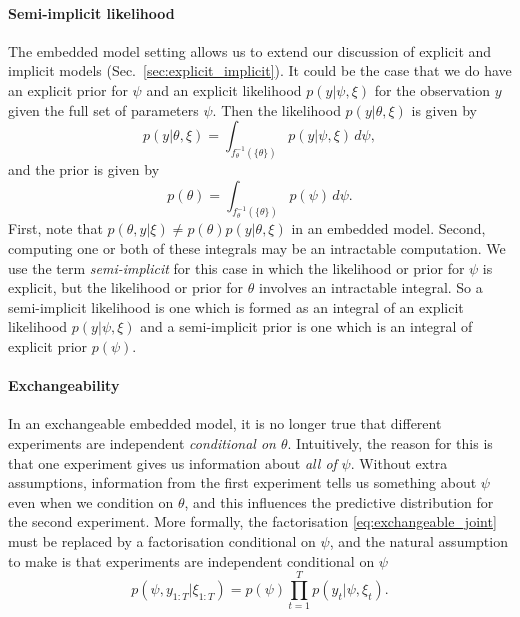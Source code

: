 \documentclass[a4paper, 10pt]{report}
\theoremstyle{plain}
\begin{document}
	\paragraph{Semi-implicit likelihood}
	The embedded model setting allows us to extend our discussion of explicit and implicit models (Sec.~\ref{sec:explicit_implicit}).
	It could be the case that we do have an explicit prior for $\psi$ and an explicit likelihood $p(y|\psi,\xi)$ for the observation $y$ given the full set of parameters $\psi$.
	Then the likelihood $p(y|\theta,\xi)$ is given by
	\begin{equation}
	\label{eq:qoi}
	p(y|\theta,\xi) = \int_{f_\theta^{-1}(\{\theta\})} p(y|\psi,\xi)\,d\psi,
	\end{equation}
	and the prior is given by
	\begin{equation}
	\label{eq:semi_implicit_prior}
	p(\theta) = \int_{f_\theta^{-1}(\{\theta\})} p(\psi)\,d\psi.
	\end{equation}
	First, note that $p(\theta,y|\xi) \ne p(\theta)p(y|\theta,\xi)$ in an embedded model.
	Second, computing one or both of these integrals may be an intractable computation.
	We use the term \emph{semi-implicit} for this case in which the likelihood or prior for $\psi$ is explicit, but the likelihood or prior for $\theta$ involves an intractable integral.
	So a semi-implicit likelihood is one which is formed as an integral of an explicit likelihood $p(y|\psi,\xi)$ and a semi-implicit prior is one which is an integral of explicit prior $p(\psi)$.
	
	
	\paragraph{Exchangeability}
	In an exchangeable embedded model, it is no longer true that different experiments are independent \emph{conditional on $\theta$}.
	Intuitively, the reason for this is that one experiment gives us information about \emph{all of} $\psi$.
	Without extra assumptions, information from the first experiment tells us something about $\psi$ even when we condition on $\theta$, and this influences the predictive distribution for the second experiment.
	More formally, the factorisation \eqref{eq:exchangeable_joint} must be replaced by a factorisation conditional on $\psi$, and the natural assumption to make is that experiments are independent conditional on $\psi$
	\begin{equation}
	\label{eq:exchangeable_joint_psi}
	p(\psi,y_{1:T}|\xi_{1:T}) = p(\psi)\prod_{t=1}^T p(y_t|\psi,\xi_t).
	\end{equation}
	
\end{document}
